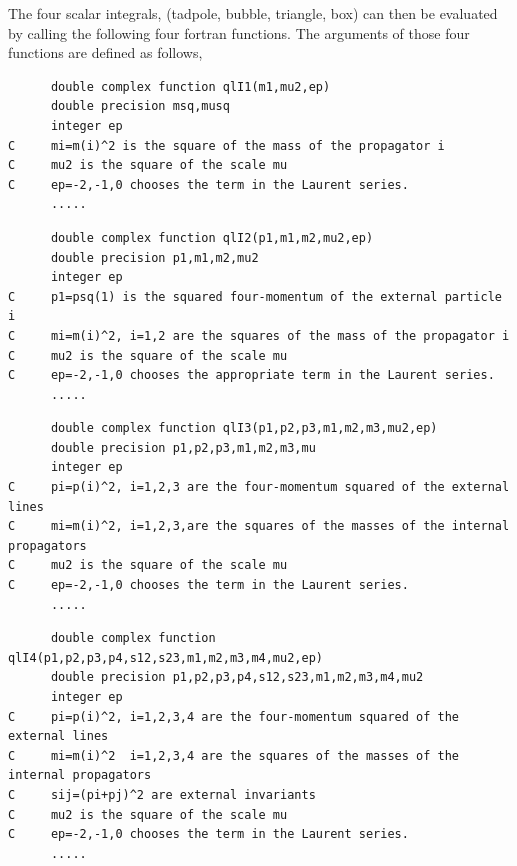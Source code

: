 \documentclass{article}
\begin{document}
The four scalar integrals, (tadpole, bubble, triangle, box) can then be
evaluated by calling the following four fortran functions.  The
arguments of those four functions are defined as follows,
\begin{verbatim}
      double complex function qlI1(m1,mu2,ep)
      double precision msq,musq
      integer ep
C     mi=m(i)^2 is the square of the mass of the propagator i 
C     mu2 is the square of the scale mu
C     ep=-2,-1,0 chooses the term in the Laurent series.
      .....
\end{verbatim}
\begin{verbatim}
      double complex function qlI2(p1,m1,m2,mu2,ep) 
      double precision p1,m1,m2,mu2
      integer ep
C     p1=psq(1) is the squared four-momentum of the external particle i 
C     mi=m(i)^2, i=1,2 are the squares of the mass of the propagator i 
C     mu2 is the square of the scale mu
C     ep=-2,-1,0 chooses the appropriate term in the Laurent series.
      .....
\end{verbatim}
\begin{verbatim}
      double complex function qlI3(p1,p2,p3,m1,m2,m3,mu2,ep)
      double precision p1,p2,p3,m1,m2,m3,mu
      integer ep
C     pi=p(i)^2, i=1,2,3 are the four-momentum squared of the external lines
C     mi=m(i)^2, i=1,2,3,are the squares of the masses of the internal propagators
C     mu2 is the square of the scale mu
C     ep=-2,-1,0 chooses the term in the Laurent series.
      .....
\end{verbatim}
\begin{verbatim}
      double complex function qlI4(p1,p2,p3,p4,s12,s23,m1,m2,m3,m4,mu2,ep)
      double precision p1,p2,p3,p4,s12,s23,m1,m2,m3,m4,mu2
      integer ep
C     pi=p(i)^2, i=1,2,3,4 are the four-momentum squared of the external lines
C     mi=m(i)^2  i=1,2,3,4 are the squares of the masses of the internal propagators
C     sij=(pi+pj)^2 are external invariants
C     mu2 is the square of the scale mu
C     ep=-2,-1,0 chooses the term in the Laurent series.
      .....
\end{verbatim}
\end{document}
